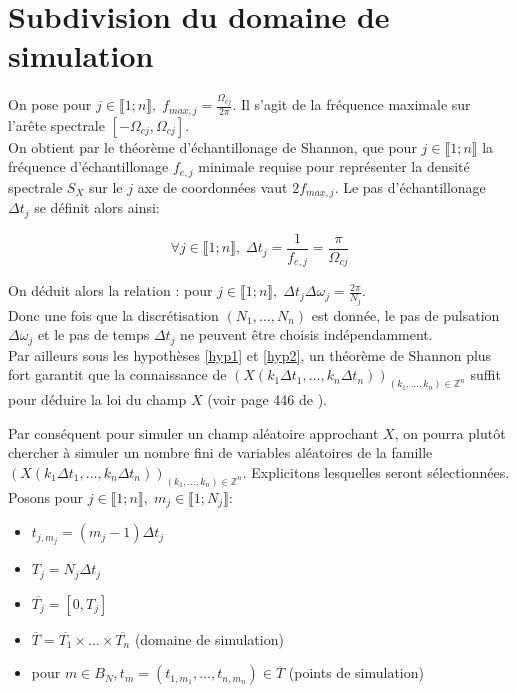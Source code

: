 \section{Subdivision du domaine de simulation}
\label{subdiv}
On pose pour $j \in \llbracket 1; n \rrbracket, \; f_{max,j} = \frac{\Omega_{cj}}{2\pi}$. Il s'agit de la fréquence maximale sur l'arête spectrale $[-\Omega_{cj},\Omega_{cj}]$.\\

On obtient par le théorème d'échantillonage de Shannon, que pour $j \in \llbracket 1; n \rrbracket$ la fréquence d'échantillonage $f_{e,j}$ minimale requise pour représenter la densité spectrale $S_X$ sur le $j$ axe de coordonnées vaut $2f_{max,j}$. Le pas d'échantillonage $\Delta t_{j}$ se définit alors ainsi:

\begin{equation} \forall j \in \llbracket 1; n \rrbracket , \; \Delta t_{j} = \frac{1}{f_{e,j}} = \frac{\pi}{\Omega_{cj}} \end{equation} 

\noindent On déduit alors la relation : pour $j \in \llbracket 1; n \rrbracket,\; \Delta t_{j}\Delta \omega_{j} = \frac{2\pi}{N_j}$.\\
Donc une fois que la discrétisation $(N_1, \dots, N_n)$ est donnée, le pas de pulsation $\Delta\omega_{j}$ et le pas de temps $\Delta t_{j}$ ne peuvent être choisis indépendamment.\\

Par ailleurs sous les hypothèses \ref{hyp1} et \ref{hyp2}, un théorème de Shannon plus fort garantit que la connaissance de $(X(k_1\Delta t_{1}, \dots, k_n\Delta t_{n}))_{(k_1, \dots, k_n) \in \mathbb{Z}^n}$ suffit pour déduire la loi du champ $X$ (voir page 446 de \cite{alma991000210539806616}). 

\noindent Par conséquent pour simuler un champ aléatoire approchant $X$, on pourra plutôt chercher à simuler un nombre fini de variables aléatoires de la famille $(X(k_1\Delta t_{1}, \dots, k_n\Delta t_{n}))_{(k_1, \dots, k_n) \in \mathbb{Z}^n}$. Explicitons lesquelles seront sélectionnées.\\

\noindent Posons pour $j \in \llbracket 1; n \rrbracket ,\; m_j \in \llbracket 1; N_j\rrbracket$:
\begin{itemize}
\item $t_{j,m_j} = (m_j - 1)\Delta t_{j}$
\item $T_j = N_j \Delta t_{j}$
\item $\overline{T_j} = [0, T_j]$


\item $\overline{T} = \overline{T_1} \times \dots \times \overline{T_n}$ (domaine de simulation)

\item pour $m \in B_N, t_m = (t_{1,m_1}, \dots, t_{n,m_n}) \in \overline{T}$ (points de simulation)\\
\end{itemize}

